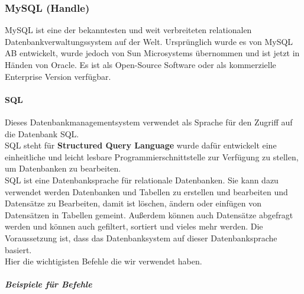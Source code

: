 \subsubsection{MySQL (Handle)}
MySQL ist eine der bekanntesten und weit verbreiteten relationalen Datenbankverwaltungssystem auf der Welt. Ursprünglich wurde es von MySQL AB entwickelt, wurde jedoch von Sun Microsystems übernommen und ist jetzt in Händen von Oracle. Es ist als Open-Source Software oder als kommerzielle Enterprise Version verfügbar.\\
\paragraph{SQL}
Dieses Datenbankmanagementsystem verwendet als Sprache für den Zugriff auf die Datenbank SQL.\\
SQL steht für \textbf{Structured Query Language} wurde dafür entwickelt eine einheitliche und leicht lesbare Programmierschnittstelle zur Verfügung zu stellen, um Datenbanken zu bearbeiten.\\
SQL ist eine Datenbanksprache für relationale Datenbanken. Sie kann dazu verwendet werden Datenbanken und Tabellen zu erstellen und bearbeiten und Datensätze zu Bearbeiten, damit ist löschen, ändern oder einfügen von Datensätzen in Tabellen gemeint. Außerdem können auch Datensätze abgefragt werden  und können auch gefiltert, sortiert und vieles mehr werden. Die Voraussetzung ist, dass das Datenbanksystem auf dieser Datenbanksprache basiert.\\
Hier die wichtigisten Befehle die wir verwendet haben.\\
\subparagraph{Beispiele für Befehle}
